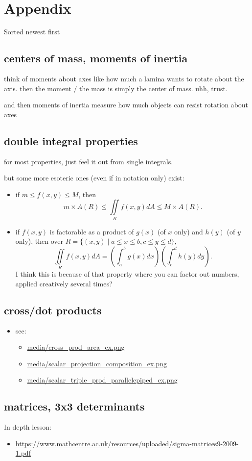 \documentclass[11pt]{article}
\theoremstyle{definition}
\newcommand{\addsection}[1]{\section*{#1}\addcontentsline{toc}{section}{#1}} %
\begin{document}
\newpage
\addsection{Appendix} 
Sorted newest first

\subsection*{centers of mass, moments of inertia}
think of moments about axes like how much a lamina wants to rotate about the axis. then the moment / the mass is simply the center of mass. uhh, trust.

and then moments of inertia measure how much objects can resist rotation about axes

\subsection*{double integral properties}
for most properties, just feel it out from single integrals.

but some more esoteric ones (even if in notation only) exist:
\begin{itemize}
  \item if $m \le f(x,y) \le M$, then
  \[ m\times A(R) \le \iint\limits_R f(x,y)dA \le M \times A(R).\]
  \item if $f(x,y)$ is factorable as a product of $g(x)$ (of $x$ only) and $h(y)$ (of $y$ only), then over $R = \{(x,y) \mid a\le x\le b, c\le y\le d\}$,
  \[\iint\limits_R f(x,y)dA  = \left(\int_{a}^{b}g(x)dx\right)\left(\int_{c}^{d}h(y)dy\right).\]
  I think this is because of that property where you can factor out numbers, applied creatively several times?
\end{itemize}

\subsection*{cross/dot products}
\begin{itemize}
  \item see:
  \begin{itemize}
    \item \url{media/cross_prod_area_ex.png}
    \item \url{media/scalar_projection_composition_ex.png}
    \item \url{media/scalar_triple_prod_parallelepiped_ex.png}
  \end{itemize}
\end{itemize}
\subsection*{matrices, 3x3 determinants}
In depth lesson:
\begin{itemize}
  \item \url{https://www.mathcentre.ac.uk/resources/uploaded/sigma-matrices9-2009-1.pdf}
\end{itemize}
\end{document}
